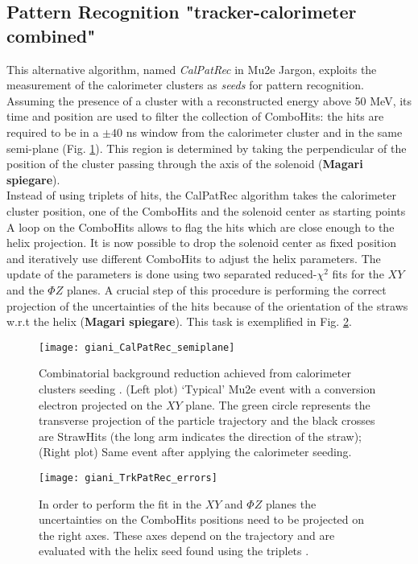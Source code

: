 \documentclass[12pt,a4paper,openright, oneside, titlepage]{book} %
\begin{document}
\subsection{Pattern Recognition "tracker-calorimeter combined"}
This alternative algorithm, named \textit{CalPatRec} in Mu2e Jargon, 
exploits the measurement of the calorimeter clusters as \textit{seeds} for pattern recognition. 
Assuming the presence of a cluster with a reconstructed energy above 50 MeV, 
its time and position are used to filter the collection of ComboHits: 
the hits are required to be in a $\pm 40$ ns window from the calorimeter cluster 
and in the same semi-plane (Fig. \ref{_CalPatRec_semiplane}). 
This region is determined by taking the perpendicular of the position 
of the cluster passing through the axis of the solenoid ({\bf{Magari spiegare}}). \\
Instead of using triplets of hits, the CalPatRec algorithm takes the calorimeter cluster position, 
one of the ComboHits and the solenoid center as starting points 
A loop on the ComboHits allows to flag the hits which are close enough to the helix projection. 
It is now possible to drop the solenoid center as fixed position 
and iteratively use different ComboHits to adjust the helix parameters.
The update of the parameters is done using two separated reduced-$\chi^2$ fits for the $XY$ and the $\Phi Z$ planes. 
A crucial step of this procedure is performing the correct projection of the uncertainties of the hits because of the orientation of the straws w.r.t the helix ({\bf{Magari spiegare}}). This task is exemplified in Fig. \ref{_TrkPatRec_errors}.

\begin{figure}[h!]
\centering
\texttt{[image: giani\_CalPatRec\_semiplane]}
\caption{Combinatorial background reduction achieved from calorimeter clusters seeding \cite{GianiPatRec:2020}. 
(Left plot)  `Typical' Mu2e event with a conversion electron projected on the $XY$ plane. 
The green circle represents the transverse projection of the particle trajectory and the black crosses are StrawHits (the long arm indicates the direction of the straw); 
(Right plot) Same event after applying the calorimeter seeding.}
\label{_CalPatRec_semiplane}
\end{figure}

\begin{figure}[h!]
\centering
\texttt{[image: giani\_TrkPatRec\_errors]}
\caption{In order to perform the fit in the $XY$ and $\Phi Z$ planes the uncertainties 
on the ComboHits positions need to be projected on the right axes. 
These axes depend on the trajectory and are evaluated with the helix seed found using the triplets \cite{GianiPatRec:2020}.}
\label{_TrkPatRec_errors}
\end{figure}
\end{document}
